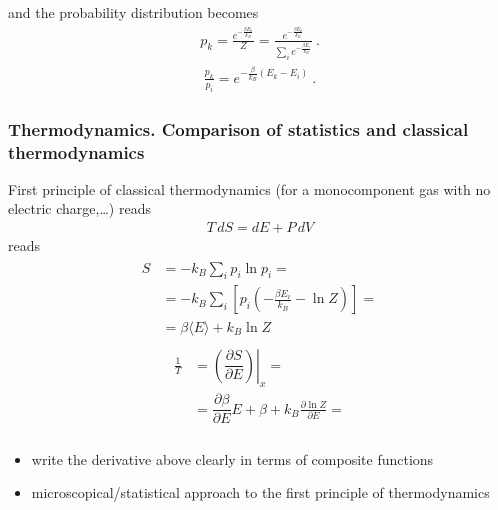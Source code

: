 \documentclass[letterpaper,10pt,english]{jupyterBook}
\begin{document}
\sphinxAtStartPar
and the probability distribution becomes
\begin{equation*}
\begin{split}p_k = \frac{e^{-\frac{\beta E_k}{k_B}}}{Z} =  \frac{e^{-\frac{\beta E_k}{k_B}}}{ \sum_{i} e^{-\frac{\beta E_i}{k_B}}} \ .\end{split}
\end{equation*}
\sphinxAtStartPar
{}
\begin{equation*}
\begin{split}\frac{p_k}{p_i} = e^{-\frac{\beta}{k_B}(E_k - E_i)} \ .\end{split}
\end{equation*}\subsubsection*{Thermodynamics. Comparison of statistics and classical thermodynamics}

\sphinxAtStartPar
First principle of classical thermodynamics (for a monocomponent gas with no electric charge,…) reads
\begin{equation*}
\begin{split}T \, dS = d E + P \, dV\end{split}
\end{equation*}
\sphinxAtStartPar
{} reads
\begin{equation*}
\begin{split}\begin{aligned}
  S 
  & = - k_B \sum_i p_i \ln p_i = \\
  & = - k_B \sum_i \left[ p_i \left( - \frac{\beta E_i}{k_B} - \ln Z \right) \right] = \\
  & = \beta \langle E \rangle + k_B \ln Z
\end{aligned}\end{split}
\end{equation*}\begin{equation*}
\begin{split}\begin{aligned}
  \frac{1}{T}
  & = \left.\left( \dfrac{\partial S}{\partial E} \right)\right|_x = \\
  & = \dfrac{\partial \beta}{\partial E} E + \beta + k_B \frac{\partial \ln Z}{\partial E} = \\
\end{aligned}\end{split}
\end{equation*}
\sphinxAtStartPar
{}
\begin{itemize}
\item {} 
\sphinxAtStartPar
write the derivative above clearly in terms of composite functions

\item {} 
\sphinxAtStartPar
microscopical/statistical approach to the first principle of thermodynamics

\end{itemize}
\end{document}
